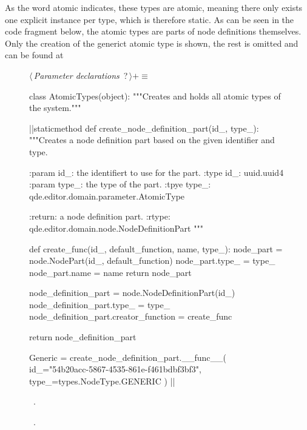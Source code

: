 \documentclass[%
    a4paper,    %
    justified,  %
    nobib,      %
    openany     %
]{tufte-book}
\begin{document}
As the word atomic indicates, these types are atomic, meaning there only exists
one explicit instance per type, which is therefore static. As can be seen in
the code fragment below, the atomic types are parts of node definitions
themselves. Only the creation of the generict atomic type is shown, the rest is
omitted and can be found at~

\begin{figure}
\begin{flushleft} \small
\begin{minipage}{\linewidth}\label{scrap65}\raggedright\small
{} $\langle\,${\itshape Parameter declarations}\nobreak\ {\footnotesize {?}}$\,\rangle+\equiv$
\vspace{-1ex}
\begin{pythoncode}
class AtomicTypes(object):
    """Creates and holds all atomic types of the system."""

    |\normalfont{}\fontfamily{}|staticmethod
    def create_node_definition_part(id_, type_):
        """Creates a node definition part based on the given identifier and
        type.

        :param id_: the identifiert to use for the part.
        :type  id_: uuid.uuid4
        :param type_: the type of the part.
        :tpye type_: qde.editor.domain.parameter.AtomicType

        :return: a node definition part.
        :rtype: qde.editor.domain.node.NodeDefinitionPart
        """

        def create_func(id_, default_function, name, type_):
            node_part = node.NodePart(id_, default_function)
            node_part.type_ = type_
            node_part.name = name
            return node_part

        node_definition_part = node.NodeDefinitionPart(id_)
        node_definition_part.type_ = type_
        node_definition_part.creator_function = create_func

        return node_definition_part

    Generic = create_node_definition_part.__func__(
        id_="54b20acc-5867-4535-861e-f461bdbf3bf3",
        type_=types.NodeType.GENERIC
    )
|\NWsep|
\end{pythoncode}
\vspace{1.5ex}
\footnotesize
\begin{list}{}{\setlength{\itemsep}{-\parsep}\setlength{\itemindent}{-\leftmargin}}
\item \NWtxtMacroDefBy\ .
\item \NWtxtMacroRefIn\ .


\end{list}
\end{minipage}
\end{flushleft}
\end{figure}
\end{document}

